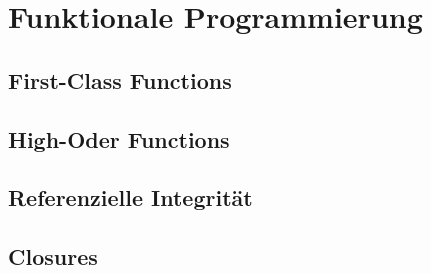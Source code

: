 \chapter{Funktionale Programmierung}

\section{First-Class Functions}

\section{High-Oder Functions}

\section{Referenzielle Integrität}

\section{Closures}